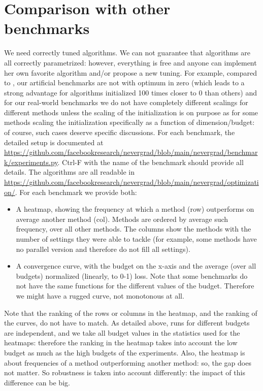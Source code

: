 \documentclass{article}
\begin{document}
\section{Comparison with other benchmarks}
We need correctly tuned algorithms. We can not guarantee that algorithms are all correctly parametrized: however, everything is free and anyone can implement her own favorite algorithm and/or propose a new tuning. For example, compared to \cite{lamcts}, our artificial benchmarks are not with optimum in zero (which leads to a strong advantage for algorithms initialized 100 times closer to 0 than others) and for our real-world benchmarks we do not have completely different scalings for different methods unless the scaling of the initialization is on purpose as for some methods scaling the initialization specifically as a function of dimension/budget: of course, such cases deserve specific discussions.
For each benchmark, the detailed setup is documented at \url{https://github.com/facebookresearch/nevergrad/blob/main/nevergrad/benchmark/experiments.py}.
Ctrl-F with the name of the benchmark should provide all details.
The algorithms are all readable in  \url{https://github.com/facebookresearch/nevergrad/blob/main/nevergrad/optimization/}.
For each benchmark we provide both:
\begin{itemize}
\item A heatmap, showing the frequency at which a method (row) outperforms on average another method (col). Methods are ordered by average such frequency, over all other methods.
The columns show the methods with the number of settings they were able to tackle (for example, some methods have no parallel version and therefore do not fill all settings).
\item A convergence curve, with the budget on the x-axis and the average (over all budgets) normalized (linearly, to 0-1) loss. Note that some benchmarks do not have the same functions for the different values of the budget. Therefore we might have a rugged curve, not monotonous at all. 
\end{itemize}
Note that the ranking of the rows or columns in the heatmap, and the ranking of the curves, do not have to match. As detailed above, runs for different budgets are independent, and we take all budget values in the statistics used for the heatmaps: therefore the ranking in the heatmap takes into account the low budget as much as the high budgets of the experiments. Also, the heatmap is about frequencies of a method outperforming another method: so, the gap does not matter. So robustness is taken into account differently: the impact of this difference can be big.
\end{document}
